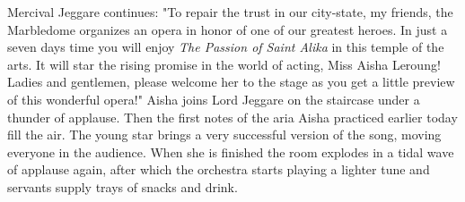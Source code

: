 Mercival Jeggare continues: "To repair the trust in our city-state, my friends, the Marbledome organizes an opera in honor of one of our greatest heroes. In just a seven days time you will enjoy {\itshape The Passion of Saint Alika} in this temple of the arts. It will star the rising promise in the world of acting, Miss Aisha Leroung! Ladies and gentlemen, please welcome her to the stage as you get a little preview of this wonderful opera!" Aisha joins Lord Jeggare on the staircase under a thunder of applause. Then the first notes of the aria Aisha practiced earlier today fill the air. The young star brings a very successful version of the song, moving everyone in the audience. When she is finished the room explodes in a tidal wave of applause again, after which the orchestra starts playing a lighter tune and servants supply trays of snacks and drink.\\

